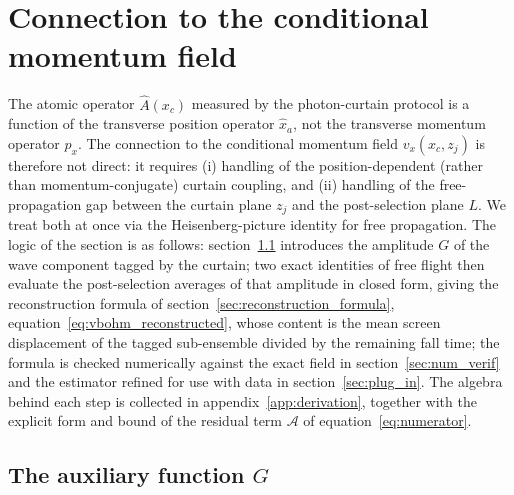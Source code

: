 \documentclass[11pt,a4paper]{article}
\begin{document}
\section{Connection to the conditional momentum field}
\label{sec:bohmian}

The atomic operator $\hat{A}(x_c)$ measured by the photon-curtain protocol is a function of the transverse position operator $\hat{x}_a$, not the transverse momentum operator $\hat{p}_x$. The connection to the conditional momentum field $v_x(x_c, z_j)$ is therefore not direct: it requires (i) handling of the position-dependent (rather than momentum-conjugate) curtain coupling, and (ii) handling of the free-propagation gap between the curtain plane $z_j$ and the post-selection plane $L$. We treat both at once via the Heisenberg-picture identity for free propagation. The logic of the section is as follows: section~\ref{sec:G_function} introduces the amplitude $G$ of the wave component tagged by the curtain; two exact identities of free flight then evaluate the post-selection averages of that amplitude in closed form, giving the reconstruction formula of section~\ref{sec:reconstruction_formula}, equation~\eqref{eq:vbohm_reconstructed}, whose content is the mean screen displacement of the tagged sub-ensemble divided by the remaining fall time; the formula is checked numerically against the exact field in section~\ref{sec:num_verif} and the estimator refined for use with data in section~\ref{sec:plug_in}. The algebra behind each step is collected in appendix~\ref{app:derivation}, together with the explicit form and bound of the residual term $\mathcal{A}$ of equation~\eqref{eq:numerator}.

\subsection{The auxiliary function \texorpdfstring{$G$}{G}}
\label{sec:G_function}
\end{document}
